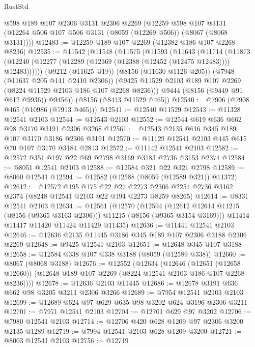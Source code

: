 \begin{lexlean}{RustStd}
\begin{coremodule}
    @598
    @189
    @107
    @2306
    @3131
    @2306
    @2269
    (@12259
      @598
      @107
      @3131
      (@12264 @506 @107 @506 @3131 (@8059 (@12269 @506)) (@8067 (@8068 @3131))))
@12483 := @12259 @189 @107 @2269 (@12382 @186 @107 @2268 @8236)
@12535 := @11542
    (@11548
      (@11575
        (@11593
          (@11643
            (@11714
              (@11873
                (@12240 (@12277 (@12289 (@12369 (@12388 (@12452 (@12475 @12483)))) @12483))))))
          (@9212 (@11625 @19))
          (@8156 (@11630 @1126 @205))
          (@7948 (@11637 @205 @141 @2410 @2306))
          (@9425 @11529 @2103 @189 @107 @2269 (@8224 @11529 @2103 @186 @107 @2268 @8236)))
        @9444
        (@8156 (@9449 @91 @612 @9936))
        @9456))
    (@8156 (@8413 @11529 @465))
@12540 := @7906 (@7908 @465 (@10986 (@7913 @465)))
@12541 := @12540 @11529
@12543 := @11328 @12541 @2103
@12544 := @12543 @2103
@12552 := @12544 @619 @636 @662 @98 @3170 @3191 @2306 @3268
@12561 := @12543 @2135 @616 @345 @189 @107 @3170 @3186 @2306 @3191
@12570 := @11129 @12541 @2103 @445 @615 @70 @107 @3170 @3184 @2813
@12572 := @11142 @12541 @2103
@12582 := @12572 @351 @197 @22 @69 @2798 @3169 @3183 @2736 @3153 @2374
@12584 := @8051 @12541 @2103
@12588 := @12584 @321 @22 @321 @2798
@12589 := @8060 @12541
@12594 := @12582 (@12588 (@8059 (@12589 @321)) @11372)
@12612 := @12572
    @195
    @175
    @22
    @27
    @2273
    @2306
    @2254
    @2736
    @3162
    @2374
    (@8248 @12541 @2103 @22 @194 @2273 @8259 @8265)
@12614 := @8331 @12541 @2103
@12634 := @12561
    (@12570
      (@12594 (@12612 @12614 @11215 (@8156 (@9365 @3163 @2306))) @11215 (@8156 (@9365 @3154 @3169)))
      @11414
      @11417
      @11420
      @11424
      @11429
      @11435)
@12636 := @11441 @12541 @2103
@12646 := @12636 @2135 @11445 @3186 @345 @189 @107 @2306 @3188 @2306 @2269
@12648 := @9425 @12541 @2103
@12651 := @12648 @345 @107 @3188
@12658 := @12584 @338 @107 @338 @3188 (@8059 (@12589 @338))
@12660 := @8067 (@8068 @3188)
@12676 := @12552
    (@12634
      (@12646
        (@12651 (@12658 @12660))
        (@12648 @189 @107 @2269 (@8224 @12541 @2103 @186 @107 @2268 @8236))))
@12678 := @12636 @2103 @11445
@12686 := @12678 @3191 @636 @662 @98 @3205 @3211 @2306 @3266
@12689 := @7954 @12541 @2103 @2103
@12699 := @12689 @624 @97 @629 @635 @98 @3202 @624 @3196 @2306 @3211
@12701 := @7971 @12541 @2103
@12704 := @12701 @629 @97 @3202
@12706 := @7980 @12541 @2103
@12714 := @12706 @420 @628 @1209 @97 @2306 @3200 @2135 @1289
@12719 := @7994 @12541 @2103 @628 @1209 @3200
@12721 := @8003 @12541 @2103
@12756 := @12719

\end{coremodule}
\end{lexlean}
